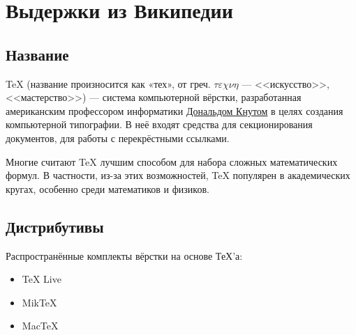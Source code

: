 \chapter{Выдержки из Википедии}
\section{Название}

\TeX{} (название произносится как «тех», от греч. $\tau\varepsilon\chi\nu\eta$ — <<искусство>>,
<<мастерство>>)   — система компьютерной вёрстки, разработанная американским профессором информатики
\href{http://en.wikipedia.org/wiki/Donald_Knuth}{Дональдом Кнутом} в целях создания компьютерной типографии. 
В неё входят средства для секционирования документов, для работы с перекрёстными ссылками. 

Многие считают TeX лучшим способом для набора сложных математических формул. В частности, из-за этих
возможностей, TeX популярен в академических кругах, особенно среди математиков и физиков.

\section{Дистрибутивы}

Распространённые комплекты вёрстки на основе ТеХ’а: 

\begin{itemize}
\item TeX Live
\item MikTeX
\item MacTeX
\end{itemize}